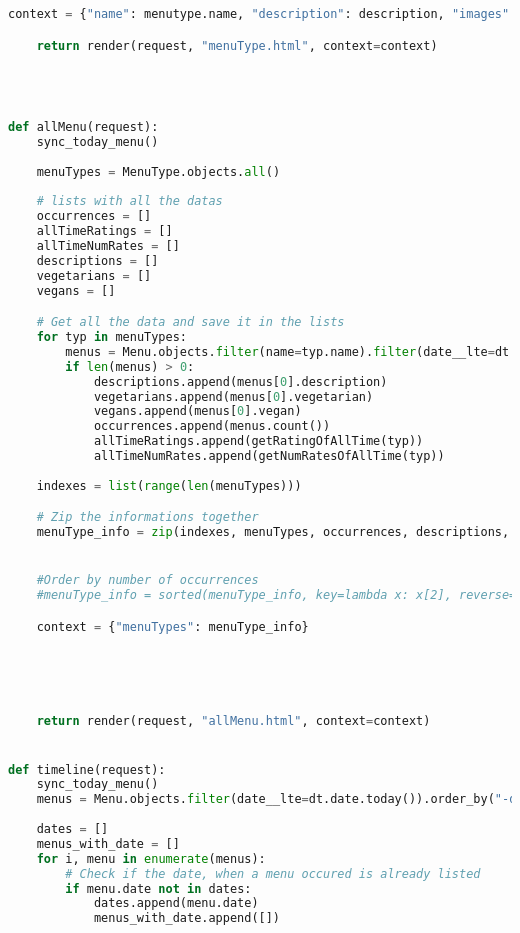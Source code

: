 \begin{lstlisting}[language=Python]
    context = {"name": menutype.name, "description": description, "images": images, "vegetarian": vegetarian, "vegan": vegan, "menu_instances": menu_instances, "occurrences": occurrences, "allTimeRating": allTimeRating, "allTimeNumRates": allTimeNumRates}

    return render(request, "menuType.html", context=context)




def allMenu(request):
    sync_today_menu()
    
    menuTypes = MenuType.objects.all()
    
    # lists with all the datas
    occurrences = []
    allTimeRatings = []
    allTimeNumRates = []
    descriptions = []
    vegetarians = []
    vegans = []

    # Get all the data and save it in the lists
    for typ in menuTypes:
        menus = Menu.objects.filter(name=typ.name).filter(date__lte=dt.date.today())
        if len(menus) > 0:
            descriptions.append(menus[0].description)
            vegetarians.append(menus[0].vegetarian)
            vegans.append(menus[0].vegan)
            occurrences.append(menus.count())
            allTimeRatings.append(getRatingOfAllTime(typ))
            allTimeNumRates.append(getNumRatesOfAllTime(typ))
        
    indexes = list(range(len(menuTypes))) 

    # Zip the informations together
    menuType_info = zip(indexes, menuTypes, occurrences, descriptions, vegetarians, vegans, allTimeRatings, allTimeNumRates)


    #Order by number of occurrences
    #menuType_info = sorted(menuType_info, key=lambda x: x[2], reverse=True)  # Sort the menu info after occurrences -> lowest to highest

    context = {"menuTypes": menuType_info}


    
   

    return render(request, "allMenu.html", context=context)


def timeline(request):
    sync_today_menu()
    menus = Menu.objects.filter(date__lte=dt.date.today()).order_by("-date")
    
    dates = []
    menus_with_date = []
    for i, menu in enumerate(menus):
        # Check if the date, when a menu occured is already listed 
        if menu.date not in dates:
            dates.append(menu.date)
            menus_with_date.append([])
        

\end{lstlisting}
